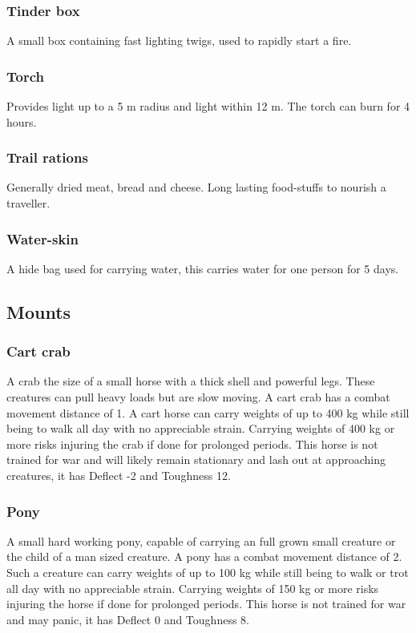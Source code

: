 \documentclass[a4paper,11pt,oneside]{book}
\newcommand{\textlf}[1]{\textbf{\titlecap{#1}}}
\begin{document}
\subsubsection*{Tinder box}
A small box containing fast lighting twigs, used to rapidly start a fire.

\subsubsection*{Torch}
Provides \textlf{full} light up to a 5 m radius and \textlf{low} light within 12 m. The torch can burn for 4 hours.

\subsubsection*{Trail rations}
Generally dried meat, bread and cheese. Long lasting food-stuffs to nourish a traveller.

\subsubsection*{Water-skin}
A hide bag used for carrying water, this carries water for one person for 5 days.

\subsection{Mounts}

\subsubsection*{Cart crab}
A crab the size of a small horse with a thick shell and powerful legs. These creatures can pull heavy loads but are slow moving. A cart crab has a combat movement distance of 1. A cart horse can carry weights of up to 400 kg while still being to walk all day with no appreciable strain. Carrying weights of 400 kg or more risks injuring the crab if done for prolonged periods. This horse is not trained for war and will likely remain stationary and lash out at approaching creatures, it has Deflect -2 and Toughness 12.

\subsubsection*{Pony}
A small hard working pony, capable of carrying an full grown small creature or the child of a man sized creature. A pony has a combat movement distance of 2. Such a creature can carry weights of up to 100 kg while still being to walk or trot all day with no appreciable strain. Carrying weights of 150 kg or more risks injuring the horse if done for prolonged periods. This horse is not trained for war and may panic, it has Deflect 0 and Toughness 8.
\end{document}
